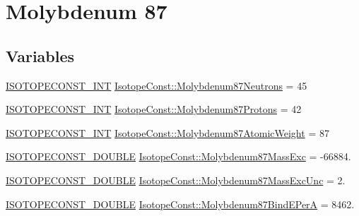 \hypertarget{group___isotope_const-_molybdenum-_mo87}{}\section{Molybdenum 87}
\label{group___isotope_const-_molybdenum-_mo87}
\subsection*{Variables}
\begin{DoxyCompactItemize}
\item 
\mbox{\hyperlink{group___isotope_const-_macros_ga5f18360b3e99483a35c32d789e62621c}{I\+S\+O\+T\+O\+P\+E\+C\+O\+N\+S\+T\+\_\+\+I\+NT}} \mbox{\hyperlink{group___isotope_const-_molybdenum-_mo87_ga598e5e36f419c718b6820ecb559890be}{Isotope\+Const\+::\+Molybdenum87\+Neutrons}} = 45
\item 
\mbox{\hyperlink{group___isotope_const-_macros_ga5f18360b3e99483a35c32d789e62621c}{I\+S\+O\+T\+O\+P\+E\+C\+O\+N\+S\+T\+\_\+\+I\+NT}} \mbox{\hyperlink{group___isotope_const-_molybdenum-_mo87_gac63641217701f753bb5a1cbaddd43e0b}{Isotope\+Const\+::\+Molybdenum87\+Protons}} = 42
\item 
\mbox{\hyperlink{group___isotope_const-_macros_ga5f18360b3e99483a35c32d789e62621c}{I\+S\+O\+T\+O\+P\+E\+C\+O\+N\+S\+T\+\_\+\+I\+NT}} \mbox{\hyperlink{group___isotope_const-_molybdenum-_mo87_gae93d1f7d143a918439661e9379c52f93}{Isotope\+Const\+::\+Molybdenum87\+Atomic\+Weight}} = 87
\item 
\mbox{\hyperlink{group___isotope_const-_macros_ga8f45a7272ce02c0b4c65c44636ed719a}{I\+S\+O\+T\+O\+P\+E\+C\+O\+N\+S\+T\+\_\+\+D\+O\+U\+B\+LE}} \mbox{\hyperlink{group___isotope_const-_molybdenum-_mo87_ga80186329054916aaeb822c23197179e6}{Isotope\+Const\+::\+Molybdenum87\+Mass\+Exc}} = -\/66884.
\item 
\mbox{\hyperlink{group___isotope_const-_macros_ga8f45a7272ce02c0b4c65c44636ed719a}{I\+S\+O\+T\+O\+P\+E\+C\+O\+N\+S\+T\+\_\+\+D\+O\+U\+B\+LE}} \mbox{\hyperlink{group___isotope_const-_molybdenum-_mo87_ga49088372e8c59908df1df3f58415f292}{Isotope\+Const\+::\+Molybdenum87\+Mass\+Exc\+Unc}} = 2.
\item 
\mbox{\hyperlink{group___isotope_const-_macros_ga8f45a7272ce02c0b4c65c44636ed719a}{I\+S\+O\+T\+O\+P\+E\+C\+O\+N\+S\+T\+\_\+\+D\+O\+U\+B\+LE}} \mbox{\hyperlink{group___isotope_const-_molybdenum-_mo87_ga891566d93e7a9a3fb8e04b32910eb7f8}{Isotope\+Const\+::\+Molybdenum87\+Bind\+E\+PerA}} = 8462.
\item 

\end{DoxyCompactItemize}
